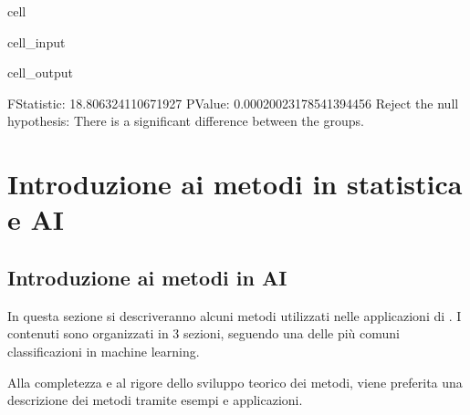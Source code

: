 \documentclass[letterpaper,10pt,italian]{jupyterBook}
\begin{document}
\begin{sphinxuseclass}{cell}
\begin{sphinxVerbatimInput}
\begin{sphinxuseclass}{cell_input}
\begin{sphinxVerbatim}[commandchars=\\\{\}]
  
   
\end{sphinxVerbatim}

\end{sphinxuseclass}\end{sphinxVerbatimInput}
\begin{sphinxVerbatimOutput}

\begin{sphinxuseclass}{cell_output}
\begin{sphinxVerbatim}[commandchars=\\\{\}]
F\PYGZhy{}Statistic: 18.806324110671927
P\PYGZhy{}Value: 0.00020023178541394456
Reject the null hypothesis: There is a significant difference between the groups.
\end{sphinxVerbatim}

\end{sphinxuseclass}\end{sphinxVerbatimOutput}

\end{sphinxuseclass}
\sphinxstepscope


\part{Introduzione ai metodi in statistica e  AI}

\sphinxstepscope


\chapter{Introduzione ai metodi in AI}
\label{\detokenize{ch/ai:introduzione-ai-metodi-in-ai}}\label{\detokenize{ch/ai:book-ai-hs}}\label{\detokenize{ch/ai::doc}}
\sphinxAtStartPar
In questa sezione si descriveranno alcuni metodi utilizzati nelle applicazioni di . I contenuti sono organizzati in 3 sezioni, seguendo una delle più comuni classificazioni in machine learning.

\sphinxAtStartPar
{} Alla completezza e al rigore dello sviluppo teorico dei metodi, viene preferita una descrizione dei metodi tramite esempi e applicazioni.
\end{document}
